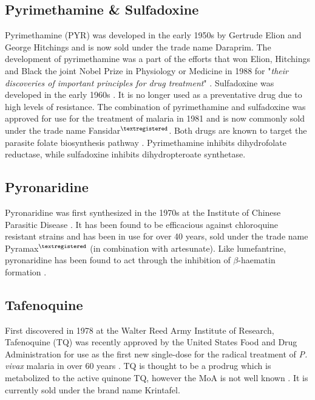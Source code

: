 \documentclass[twocolumn]{bmcart}%
\begin{document}
\subsection*{Pyrimethamine \& Sulfadoxine}
Pyrimethamine (PYR) was developed in the early 1950s by Gertrude Elion and George Hitchings and is now sold under the trade name Daraprim\texttrademark \cite{Russell1951}. The development of pyrimethamine was a part of the efforts that won Elion, Hitchings and Black the joint Nobel Prize in Physiology or Medicine in 1988 for "\textit{their discoveries of important principles for drug treatment}" \cite{Nobelprize1988}. Sulfadoxine was developed in the early 1960s \cite{Laing1965}. It is no longer used as a preventative drug due to high levels of resistance. The combination of pyrimethamine and sulfadoxine was approved for use for the treatment of malaria in 1981 and is now commonly sold under the trade name Fansidar$^{\scriptsize{\textregistered}}$. Both drugs are known to target the parasite folate biosynthesis pathway \cite{Lumb2011}. Pyrimethamine inhibits dihydrofolate reductase, while sulfadoxine inhibits dihydropteroate synthetase.

\subsection*{Pyronaridine}
Pyronaridine was first synthesized in the 1970s at the Institute of Chinese Parasitic Disease \cite{Zheng1979,Chang1992}. It has been found to be efficacious against chloroquine resistant strains and has been in use for over 40 years, sold under the trade name Pyramax$^{\scriptsize{\textregistered}}$ (in combination with artesunate). Like lumefantrine, pyronaridine has been found to act through the inhibition of $\beta$-haematin formation \cite{Croft2012}.

\subsection*{Tafenoquine}
First discovered in 1978 at the Walter Reed Army Institute of Research, Tafenoquine (TQ) was recently approved by the United States Food and Drug Administration for use as the first new single-dose for the radical treatment of \textit{P. vivax} malaria in over 60 years \cite{Krintafel}. TQ is thought to be a prodrug which is metabolized to the active quinone TQ, however the MoA is not well known \cite{Ebstie2016}. It is currently sold under the brand name Krintafel.
\end{document}
